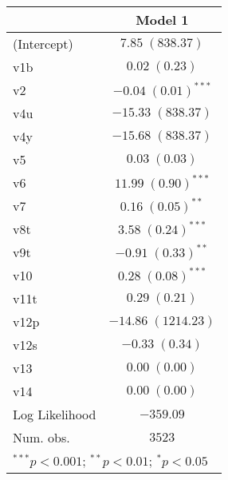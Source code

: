 
\begin{tabular}{l c}
\toprule
 & Model 1 \\
\midrule
(Intercept)    & $7.85 \;  (838.37)$        \\
v1b            & $0.02 \;    (0.23)$        \\
v2             & $-0.04 \;    (0.01)^{***}$ \\
v4u            & $-15.33 \;  (838.37)$      \\
v4y            & $-15.68 \;  (838.37)$      \\
v5             & $0.03 \;    (0.03)$        \\
v6             & $11.99 \;    (0.90)^{***}$ \\
v7             & $0.16 \;    (0.05)^{**}$   \\
v8t            & $3.58 \;    (0.24)^{***}$  \\
v9t            & $-0.91 \;    (0.33)^{**}$  \\
v10            & $0.28 \;    (0.08)^{***}$  \\
v11t           & $0.29 \;    (0.21)$        \\
v12p           & $-14.86 \; (1214.23)$      \\
v12s           & $-0.33 \;    (0.34)$       \\
v13            & $0.00 \;    (0.00)$        \\
v14            & $0.00 \;    (0.00)$        \\
\midrule
Log Likelihood & $-359.09$                  \\
Num. obs.      & $3523$                     \\
\bottomrule
\multicolumn{2}{l}{\scriptsize{$^{***}p<0.001$; $^{**}p<0.01$; $^{*}p<0.05$}}
\end{tabular}
